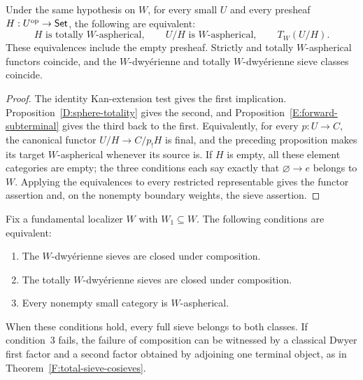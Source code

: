 \begin{corollary}\label{D:sphere-presheaves}
Under the same hypothesis on $W$, for every small $U$ and
every presheaf $H:U^{\mathrm{op}}\to\mathsf{Set}$, the following are
equivalent:
\[
 H\text{ is totally }W\text{-aspherical},\qquad
 U/H\text{ is }W\text{-aspherical},\qquad
 T_W(U/H).
\]
These equivalences include the empty presheaf. Strictly
and totally $W$-aspherical functors coincide, and the
$W$-dwy\'erienne and totally $W$-dwy\'erienne sieve
classes coincide.
\end{corollary}

\begin{proof}
The identity Kan-extension test gives the first
implication. Proposition~\ref{D:sphere-totality} gives
the second, and Proposition~\ref{E:forward-subterminal}
gives the third back to the first. Equivalently, for
every $p:U\to C$, the canonical functor
$U/H\to C/p_!H$ is final, and the preceding proposition
makes its target $W$-aspherical whenever its source is.
If $H$ is empty, all these element categories are empty;
the three conditions each say exactly that
$\varnothing\to e$ belongs to $W$. Applying the
equivalences to every restricted representable gives
the functor assertion and, on the nonempty boundary
weights, the sieve assertion.
\end{proof}

\begin{theorem}\label{D:sphere-sieve-composition}
Fix a fundamental localizer $W$ with $W_1\subseteq W$.
The following conditions are equivalent:
\begin{enumerate}
\item The $W$-dwy\'erienne sieves are closed under
composition.
\item The totally $W$-dwy\'erienne sieves are closed
under composition.
\item Every nonempty small category is $W$-aspherical.
\end{enumerate}
When these conditions hold, every full sieve belongs
to both classes. If condition~3 fails, the failure of
composition can be witnessed by a classical Dwyer
first factor and a second factor obtained by adjoining
one terminal object, as in
Theorem~\ref{F:total-sieve-cosieves}.
\end{theorem}

